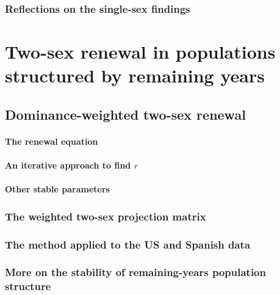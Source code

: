     \section{Reflections on the single-sex findings}
      
\part{Two-sex renewal in populations structured by remaining years}
  
  
  \chapter{Dominance-weighted two-sex renewal}
    
    
    \subsection{The renewal equation}
      
      
    \subsection{An iterative approach to find $r$}
        
        
    \subsection{Other stable parameters}
        
  
  \section{The weighted two-sex projection matrix}
      
  
  \section{The method applied to the US and Spanish data}
      
        
  \section{More on the stability of remaining-years population structure}
    
  
